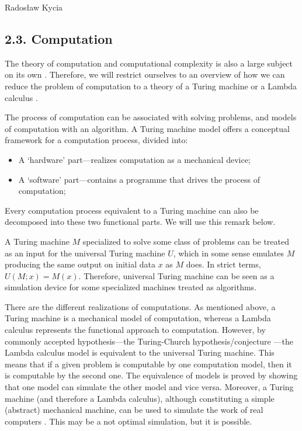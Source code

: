 \begin{artengenv}{Radosław Kycia}
\subsection{2.3. Computation}
The theory of computation and computational complexity is also a large subject on its own \parencite{HopcroftUllman}. Therefore, we will restrict ourselves to an overview of how we can reduce the problem of computation to a theory of a Turing machine or a Lambda calculus \parencite{LambdaCalculus, RosettaStone_Baez, HopcroftUllman}.

The process of computation can be associated with solving problems, and models of computation with an algorithm. A Turing machine model offers a conceptual framework for a computation process, divided into:
\begin{itemize}
 \item {A `hardware' part---realizes computation as a mechanical device;}
 \item {A `software' part---contains a programme that drives the process of computation;}
\end{itemize}
Every computation process equivalent to a Turing machine can also be decomposed into these two functional parts. We will use this remark below.

A Turing machine $M$ specialized to solve some class of problems can be treated as an input for the universal Turing machine $U$, which in some sense emulates $M$ producing the same output on initial data $x$ as $M$ does. In strict terms, $U(M;x) =M(x)$. Therefore, universal Turing machine can be seen as a simulation device for some specialized machines treated as algorithms. 

There are the different realizations of computations. As mentioned above, a Turing machine is a mechanical model of computation, whereas a Lambda calculus represents the functional approach to computation. However, by commonly accepted hypothesis---the Turing-Church hypothesis/conjecture \parencite{HopcroftUllman}---the Lambda calculus model is equivalent to the universal Turing machine. This means that if a given problem is computable by one computation model, then it is computable by the second one. The equivalence of models is proved by showing that one model can simulate the other model and vice versa. Moreover, a Turing machine (and therefore a Lambda calculus), although constituting a simple (abstract) mechanical machine, can be used to simulate the work of real computers \parencite{HopcroftUllman}. This may be a not optimal simulation, but it is possible. 



\end{artengenv}
